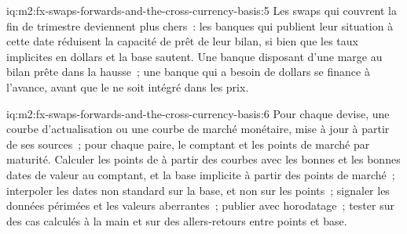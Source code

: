 \begin{solution}{iq:m2:fx-swaps-forwards-and-the-cross-currency-basis:5}
Les swaps qui couvrent la fin de trimestre deviennent plus chers~: les banques qui publient leur situation à cette date
réduisent la capacité de prêt de leur bilan, si bien que les taux implicites en dollars et la base sautent.
Une banque disposant d'une marge au bilan prête dans la hausse~; une banque qui a besoin de dollars
se finance à l'avance, avant que le  ne soit intégré dans les prix.
\end{solution}

\begin{solution}{iq:m2:fx-swaps-forwards-and-the-cross-currency-basis:6}
Pour chaque devise, une courbe d'actualisation ou une courbe de marché monétaire, mise à jour à partir de ses sources~;
pour chaque paire, le comptant et les points de marché par maturité. Calculer les points de  à partir des courbes
avec les bonnes  et les bonnes dates de valeur au comptant, et la base implicite
à partir des points de marché~; interpoler les dates non standard sur la base, et non sur les points~; signaler les données périmées
et les valeurs aberrantes~; publier avec horodatage~; tester sur des cas calculés à la main et
sur des allers-retours entre points et base.
\end{solution}
